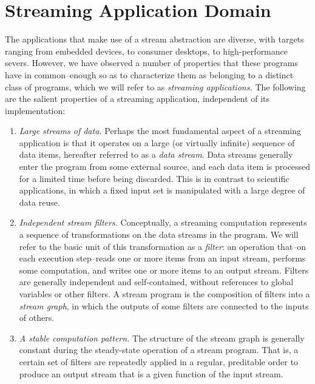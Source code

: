 \section{Streaming Application Domain}
\label{sec:domain}

The applications that make use of a stream abstraction are diverse,
with targets ranging from embedded devices, to consumer desktops, to
high-performance severs.  However, we have observed a number of
properties that these programs have in common--enough so as to
characterize them as belonging to a distinct class of programs, which
we will refer to as {\it streaming applications.}  The following are
the salient properties of a streaming application, independent of its
implementation:
\begin{enumerate}

\item {\it Large streams of data.}  Perhaps the most fundamental
aspect of a streaming application is that it operates on a large (or
virtually infinite) sequence of data items, hereafter referred to as a
{\it data stream}.  Data streams generally enter the program from some
external source, and each data item is processed for a limited time
before being discarded.  This is in contrast to scientific
applications, in which a fixed input set is manipulated with a large
degree of data reuse.

\item {\it Independent stream filters.}  Conceptually, a streaming computation
represents a sequence of transformations on the data streams in the
program.  We will refer to the basic unit of this transformation as a
{\it filter}: an operation that--on each execution step--reads one or
more items from an input stream, performs some computation, and writes
one or more items to an output stream.  Filters are generally
independent and self-contained, without references to global variables
or other filters.  A stream program is the composition of filters into
a {\it stream graph}, in which the outputs of some filters are
connected to the inputs of others.

\item {\it A stable computation pattern.}  The structure of the stream
graph is generally constant during the steady-state operation of a
stream program.  That is, a certain set of filters are repeatedly
applied in a regular, preditable order to produce an output stream
that is a given function of the input stream.


\end{enumerate}
